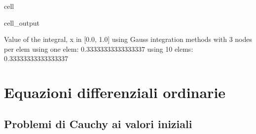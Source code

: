 \documentclass[letterpaper,10pt,italian]{jupyterBook}
\begin{document}
\begin{sphinxuseclass}{cell}
\begin{sphinxVerbatimOutput}
\begin{sphinxuseclass}{cell_output}
\begin{sphinxVerbatim}[commandchars=\\\{\}]
Value of the integral, x \PYGZbs{}in [0.0, 1.0] using Gauss integration methods with 3 nodes per elem
\PYGZhy{} using one elem: 0.33333333333333337
\PYGZhy{} using 10 elems: 0.33333333333333337
\end{sphinxVerbatim}

\end{sphinxuseclass}\end{sphinxVerbatimOutput}

\end{sphinxuseclass}
\sphinxstepscope


\chapter{Equazioni differenziali ordinarie}
\label{\detokenize{ch/numerics/ode:equazioni-differenziali-ordinarie}}\label{\detokenize{ch/numerics/ode::doc}}
\sphinxstepscope


\section{Problemi di Cauchy ai valori iniziali}
\label{\detokenize{ch/numerics/ode-cauchy:problemi-di-cauchy-ai-valori-iniziali}}\label{\detokenize{ch/numerics/ode-cauchy::doc}}
\end{document}
